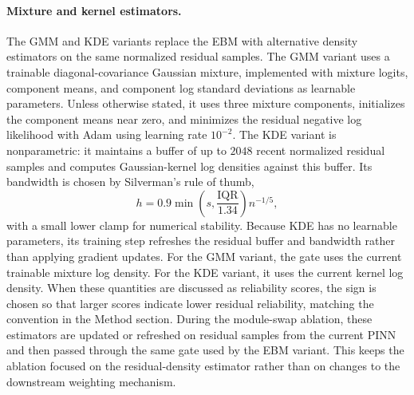 \documentclass{article}
\theoremstyle{plain}
\theoremstyle{definition}
\theoremstyle{remark}
\begin{document}
\paragraph{Mixture and kernel estimators.}
The GMM and KDE variants replace the EBM with alternative density estimators on the same normalized residual samples.
The GMM variant uses a trainable diagonal-covariance Gaussian mixture, implemented with mixture logits, component means, and component log standard deviations as learnable parameters.
Unless otherwise stated, it uses three mixture components, initializes the component means near zero, and minimizes the residual negative log likelihood with Adam using learning rate $10^{-2}$.
The KDE variant is nonparametric: it maintains a buffer of up to $2048$ recent normalized residual samples and computes Gaussian-kernel log densities against this buffer.
Its bandwidth is chosen by Silverman's rule of thumb,
\begin{equation}
h = 0.9 \min\!\left(s,\frac{\mathrm{IQR}}{1.34}\right)n^{-1/5},
\end{equation}
with a small lower clamp for numerical stability.
Because KDE has no learnable parameters, its training step refreshes the residual buffer and bandwidth rather than applying gradient updates.
For the GMM variant, the gate uses the current trainable mixture log density.
For the KDE variant, it uses the current kernel log density.
When these quantities are discussed as reliability scores, the sign is chosen so that larger scores indicate lower residual reliability, matching the convention in the Method section.
During the module-swap ablation, these estimators are updated or refreshed on residual samples from the current PINN and then passed through the same gate used by the EBM variant.
This keeps the ablation focused on the residual-density estimator rather than on changes to the downstream weighting mechanism.
\end{document}
